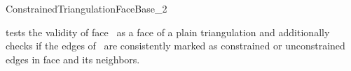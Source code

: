\begin{ccRefConcept}{ConstrainedTriangulationFaceBase_2}
\begin{ccAdvanced}
{tests the validity of face  \ccVar\ 
as a face of a plain triangulation
and additionally checks
if the edges of \ccVar\ are consistently marked
as constrained or unconstrained edges
in face \ccVar and its neighbors.}
\end{ccAdvanced}



\ccHasModels



\ccSeeAlso
{} \\
 \\


\end{ccRefConcept}


